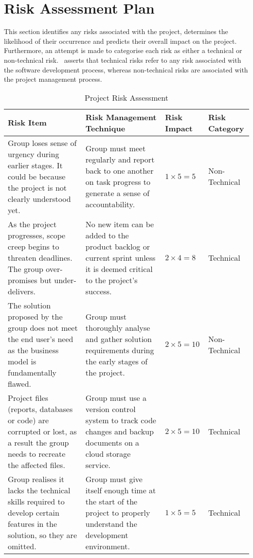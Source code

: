 \section{Risk Assessment Plan}

This section identifies any risks associated with the project, determines the likelihood of their occurrence and predicts their overall impact on the project. Furthermore, an attempt is made to categorise each risk as either a technical or non-technical risk.~\parencite{dawson} asserts that technical risks refer to any risk associated with the software development process, whereas non-technical risks are associated with the project management process.

\begin{table}
  \caption[Project Risk Assessment]{Project Risk Assessment \hfill}
  \label{tab:runtime}
  \begin{tabular*}{14.0cm}{p{4.0cm}p{5.0cm}p{1.5cm}p{2cm}}
    \toprule
    Risk Item & Risk Management Technique & Risk Impact & Risk Category \\
    \midrule
    Group loses sense of urgency during earlier stages. It could be because the project is not clearly understood yet. & Group must meet regularly and report back to one another on task progress to generate a sense of accountability. & $1 \times 5 = 5$ & Non-Technical \\
    \addlinespace[0.5em]
    As the project progresses, scope creep begins to threaten deadlines. The group over-promises but under-delivers. & No new item can be added to the product backlog or current sprint unless it is deemed critical to the project’s success. & $2 \times 4 = 8$ & Technical \\
    \addlinespace[0.5em]
    The solution proposed by the group does not meet the end user's need as the business model is fundamentally flawed. & Group must thoroughly analyse and gather solution requirements during the early stages of the project. & $2 \times 5 = 10$ & Non-Technical \\
    \addlinespace[0.5em]
    Project files (reports, databases or code) are corrupted or lost, as a result the group needs to recreate the affected files. & Group must use a version control system to track code changes and backup documents on a cloud storage service. & $2 \times 5 = 10$ & Technical \\
    \addlinespace[0.5em]
    Group realises it lacks the technical skills required to develop certain features in the solution, so they are omitted. & Group must give itself enough time at the start of the project to properly understand the development environment. & $1 \times 5 = 5$ & Technical \\

\end{tabular*}
\end{table}
